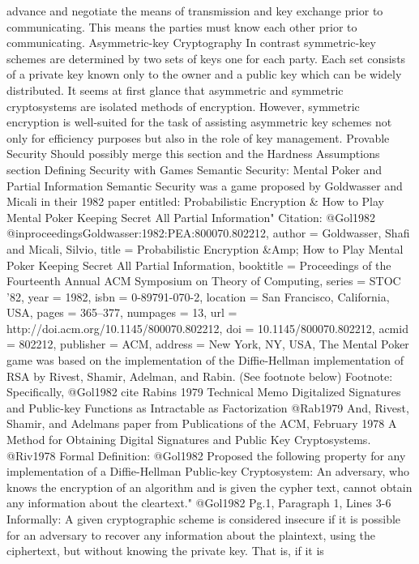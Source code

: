 advance and negotiate the means of transmission and key exchange prior
to communicating. This means the parties must know each other prior to
communicating. Asymmetric-key Cryptography In contrast symmetric-key
schemes are determined by two sets of keys one for each party. Each set
consists of a private key known only to the owner and a public key
which can be widely distributed. It seems at first glance that
asymmetric and symmetric cryptosystems are isolated methods of
encryption. However, symmetric encryption is well-suited for the task
of assisting asymmetric key schemes not only for efficiency purposes
but also in the role of key management. Provable Security Should
possibly merge this section and the Hardness Assumptions section
Defining Security with Games Semantic Security: Mental Poker and
Partial Information Semantic Security was a game proposed by Goldwasser
and Micali in their 1982 paper entitled: Probabilistic Encryption & How
to Play Mental Poker Keeping Secret All Partial Information" Citation:
@Gol1982 @inproceedings{Goldwasser:1982:PEA:800070.802212, author =
{Goldwasser, Shafi and Micali, Silvio}, title = {Probabilistic
Encryption \&Amp; How to Play Mental Poker Keeping Secret All Partial
Information}, booktitle = {Proceedings of the Fourteenth Annual ACM
Symposium on Theory of Computing}, series = {STOC '82}, year = {1982},
isbn = {0-89791-070-2}, location = {San Francisco, California, USA},
pages = {365--377}, numpages = {13}, url =
{http://doi.acm.org/10.1145/800070.802212}, doi =
{10.1145/800070.802212}, acmid = {802212}, publisher = {ACM}, address =
{New York, NY, USA}, } The Mental Poker game was based on the
implementation of the Diffie-Hellman implementation of RSA by Rivest,
Shamir, Adelman, and Rabin. (See footnote below) Footnote:
Specifically, @Gol1982 cite Rabins 1979 Technical Memo Digitalized
Signatures and Public-key Functions as Intractable as Factorization
@Rab1979 And, Rivest, Shamir, and Adelmans paper from Publications of
the ACM, February 1978 A Method for Obtaining Digital Signatures and
Public Key Cryptosystems. @Riv1978 Formal Definition: @Gol1982 Proposed
the following property for any implementation of a Diffie-Hellman
Public-key Cryptosystem: An adversary, who knows the encryption of an
algorithm and is given the cypher text, cannot obtain any information
about the cleartext." @Gol1982 Pg.1, Paragraph 1, Lines 3-6 Informally:
A given cryptographic scheme is considered insecure if it is possible
for an adversary to recover any information about the plaintext, using
the ciphertext, but without knowing the private key. That is, if it is

